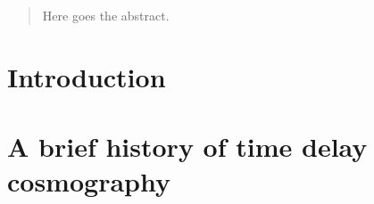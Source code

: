 \date{Received: date / Accepted: date}

\maketitle


\begin{abstract}

Here goes the abstract.


\end{abstract}


\section{Introduction}
\label{sec:intro}


\section{A brief history of time delay cosmography}
\label{sec:history}









